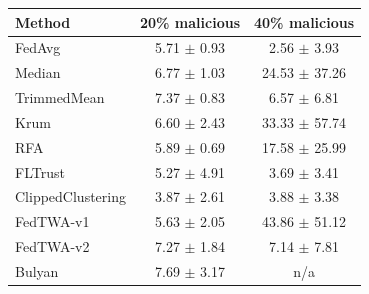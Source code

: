 \begin{tabular}{lcc}
\toprule
Method & 20\% malicious & 40\% malicious \\
\midrule
FedAvg & 5.71 $\pm$ 0.93 & 2.56 $\pm$ 3.93 \\
Median & 6.77 $\pm$ 1.03 & 24.53 $\pm$ 37.26 \\
TrimmedMean & 7.37 $\pm$ 0.83 & 6.57 $\pm$ 6.81 \\
Krum & 6.60 $\pm$ 2.43 & 33.33 $\pm$ 57.74 \\
RFA & 5.89 $\pm$ 0.69 & 17.58 $\pm$ 25.99 \\
FLTrust & 5.27 $\pm$ 4.91 & 3.69 $\pm$ 3.41 \\
ClippedClustering & 3.87 $\pm$ 2.61 & 3.88 $\pm$ 3.38 \\
FedTWA-v1 & 5.63 $\pm$ 2.05 & 43.86 $\pm$ 51.12 \\
FedTWA-v2 & 7.27 $\pm$ 1.84 & 7.14 $\pm$ 7.81 \\
Bulyan & 7.69 $\pm$ 3.17 & n/a \\
\bottomrule
\end{tabular}